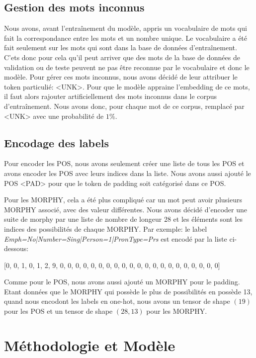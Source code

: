 \documentclass[a4paper]{article}
\begin{document}
\subsection{Gestion des mots inconnus}

Nous avons, avant l'entraînement du modèle, appris un vocabulaire de mots qui fait la correspondance entre les mots et un nombre unique.
Le vocabulaire a été fait seulement sur les mots qui sont dans la base de données d'entraînement. C'ets donc pour cela qu'il peut
arriver que des mots de la base de données de validation ou de teste peuvent ne pas être reconnue par le vocabulaire et donc le modèle.
Pour gérer ces mots inconnus, nous avons décidé de leur attribuer le token particulié: <UNK>. Pour que le modèle
appraine l'embedding de ce mots, il faut alors rajouter artificiellement des mots inconnus dans le corpus d'entraînement. Nous avons
donc, pour chaque mot de ce corpus, remplacé par <UNK> avec une probabilité de $1\%$.


\subsection{Encodage des labels}

Pour encoder les POS, nous avons seulement créer une liste de tous les POS et avons encoder les POS avec leurs indices dans la liste.
Nous avons aussi ajouté le POS <PAD> pour que le token de padding soit catégorisé dans ce POS.


Pour les MORPHY, cela a été plus compliqué car un mot peut avoir plusieurs MORPHY associé, avec des valeur différentes. Nous avons 
décidé d'encoder une suite de morphy par une liste de nombre de longeur $28$ et les éléments sont les indices des possibilités de chaque
MORPHY. Par exemple: le label \textit{Emph=No|Number=Sing|Person=1|PronType=Prs} est encodé par la liste ci-dessous:

[0, 0, 1, 0, 1, 2, 9, 0, 0, 0, 0, 0, 0, 0, 0, 0, 0, 0, 0, 0, 0, 0, 0, 0, 0, 0, 0, 0]

Comme pour le POS, nous avons aussi ajouté un MORPHY pour le padding. Etant données que le MORPHY qui possède
le plus de possibilités en possède 13, quand nous encodont les labels en one-hot, nous avons un tensor de shape
$(19)$ pour les POS et un tensor de shape $(28, 13)$ pour les MORPHY.

\section{Méthodologie et Modèle}
\end{document}
